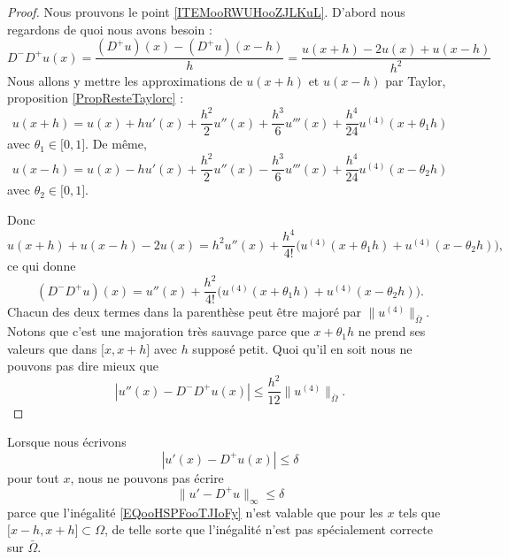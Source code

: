 \begin{proof}
    Nous prouvons le point \ref{ITEMooRWUHooZJLKuL}. D'abord nous regardons de quoi nous avons besoin :
    \begin{equation}        \label{EQooBLIIooWHXbqD}
        D^-D^+u(x)=\frac{ (D^+u)(x)-(D^+u)(x-h) }{ h }=\frac{ u(x+h)-2u(x)+u(x-h) }{ h^2 }
    \end{equation}
    Nous allons y mettre les approximations de \( u(x+h)\) et \( u(x-h)\) par Taylor, proposition \ref{PropResteTaylorc} :
    \begin{equation}
        u(x+h)=u(x)+hu'(x)+\frac{ h^2 }{2}u''(x)+\frac{ h^3 }{ 6 }u'''(x)+\frac{ h^4 }{ 24 }u^{(4)}(x+\theta_1h)
    \end{equation}
    avec \( \theta_1\in \mathopen[ 0 , 1 \mathclose]\). De même,
    \begin{equation}
        u(x-h)=u(x)-hu'(x)+\frac{ h^2 }{2}u''(x)-\frac{ h^3 }{ 6 }u'''(x)+\frac{ h^4 }{ 24 }u^{(4)}(x-\theta_2h)
    \end{equation}
    avec \( \theta_2\in \mathopen[ 0 , 1 \mathclose]\).

    Donc
    \begin{equation}
        u(x+h)+u(x-h)-2u(x)=h^2u''(x)+\frac{ h^4 }{ 4! }\Big( u^{(4)}(x+\theta_1h)+u^{(4)}(x-\theta_2h) \Big),
    \end{equation}
    ce qui donne
    \begin{equation}
        (D^-D^+u)(x)=u''(x)+\frac{ h^2 }{ 4! }\Big( u^{(4)}(x+\theta_1h)+u^{(4)}(x-\theta_2h) \Big).
    \end{equation}
    Chacun des deux termes dans la parenthèse peut être majoré par \( \| u^{(4)} \|_{\bar\Omega}\). Notons que c'est une majoration très sauvage parce que \( x+\theta_1h\) ne prend ses valeurs que dans \( \mathopen[ x , x+h \mathclose]\) avec \( h\) supposé petit. Quoi qu'il en soit nous ne pouvons pas dire mieux que
    \begin{equation}
        | u''(x)-D^-D^+u(x) |\leq \frac{ h^2 }{ 12 }\| u^{(4)} \|_{\bar\Omega}.
    \end{equation}
\end{proof}

\begin{remark}
    Lorsque nous écrivons
    \begin{equation}        \label{EQooHSPFooTJIoFy}
        | u'(x)-D^+u(x) |\leq \delta
    \end{equation}
    pour tout \( x\), nous ne pouvons pas écrire
    \begin{equation}
        \| u'-D^+u \|_{\infty}\leq \delta
    \end{equation}
    parce que l'inégalité \eqref{EQooHSPFooTJIoFy} n'est valable que pour les \( x\) tels que \( \mathopen[ x-h , x+h \mathclose]\subset \Omega\), de telle sorte que l'inégalité n'est pas spécialement correcte sur \( \bar\Omega\).
\end{remark}

